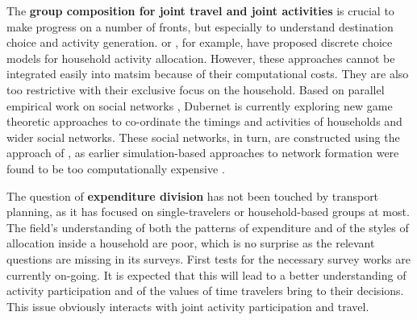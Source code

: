 The \textbf{group composition for joint travel and joint activities} is crucial to make progress on a number of fronts, but especially to understand destination choice and activity generation. 
\citet{GliebeKoppelman_Transportation_2005} or
\citet{ZhangEtAl_TransResB_2005},
for example, have proposed discrete choice models for household activity allocation. However, these approaches cannot be integrated easily into \gls{matsim} because of their computational costs. They are also too restrictive with their exclusive focus on the household.  Based on parallel empirical work on social networks 
\citep[see][]{LarsenEtAl_MOB_2006,KowaldEtAl_JTG_2013},
Dubernet is currently exploring new game theoretic approaches to co-ordinate the timings and activities of households and wider social networks.  These social networks, in turn, are constructed using the approach of 
\citet{ArentzeEtAl_SN_2013},
as earlier simulation-based approaches to network formation were found to be too computationally expensive \citep[e.g.,][]{Hackney_PhDThesis_2009}.

The question of \textbf{expenditure division} has not been touched by transport planning, as it has focused on single-travelers or household-based groups at most. The field's understanding of both the patterns of expenditure and of the styles of allocation inside a household are poor, which is no surprise as the relevant questions are missing in its surveys. First tests for the necessary survey works are currently on-going. It is expected that this will lead to a better understanding of activity participation and of the values of time travelers bring to their decisions. This issue obviously interacts with joint activity participation and travel. 

% 
